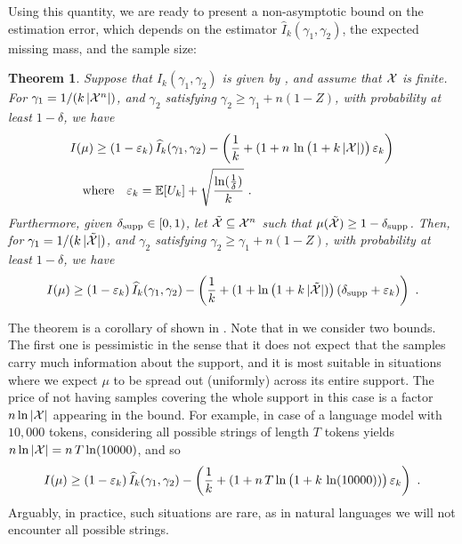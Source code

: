 \documentclass[a4paper]{article}
\theoremstyle{plain}
\newtheorem{theorem}{Theorem}[section]
\theoremstyle{definition}
\theoremstyle{plain}
\begin{document}
Using this quantity, we are ready to present a non-asymptotic bound on the estimation error, which depends on the estimator $\widehat I_k(\gamma_1, \gamma_2)$, the expected missing mass, and the sample size:%
\begin{theorem}
\label{thm:emp-wav-MI1}
Suppose that $\widehat I_k(\gamma_1, \gamma_2)$ is given by , and assume that ${\mathcal{X}}$ is finite.
%
For $\gamma_1 = 1/(k \, |{\mathcal{X}}^n|)$, and $\gamma_2$ satisfying $\gamma_2 \geq \gamma_1 + n (1-Z)$,
with probability at least $1-\delta$, we have
  \begin{align*}
    &I(\mu)
    \geq
    (1 - \varepsilon_k) \, \widehat I_k(\gamma_1, \gamma_2)
    -
    \left( 
    \frac{1}{k}
    +
    (1+
    n \, \ln \big( 1 + k \, |{\mathcal{X}}|) \big) \, \varepsilon_k
     \right)\\
    &\quad\text{where} \quad \varepsilon_k = \mathbb{E}[U_k] + \sqrt{\frac{\ln(\frac{1}{\delta})}{k}}~.
  \end{align*}
  Furthermore, given $\delta_{\mathrm{supp}} \in [0, 1)$, let $\tilde {{\mathcal{X}}} \subseteq {\mathcal{X}}^n$ such that $\mu(\tilde {{\mathcal{X}}}) \geq 1 - \delta_{\mathrm{supp}}$.
  Then, for $\gamma_1 = 1/(k \, |\tilde {{\mathcal{X}}}|)$, and $\gamma_2$ satisfying $\gamma_2 \geq \gamma_1 + n (1-Z)$,
with probability at least $1-\delta$, we have
  \begin{align*}
    I(\mu)
    \geq
    (1 - \varepsilon_k) \, \widehat I_k(\gamma_1, \gamma_2)
    -
    \left( 
    \frac{1}{k}
    +
    (1+ \ln \big( 1 + k \, |\tilde{{\mathcal{X}}}|) \big) \left(  \delta_{\mathrm{supp}} + \varepsilon_k  \right)
     \right)~.
  \end{align*}
\end{theorem}
%
%
The theorem is a corollary of  shown in .
%
%
Note that in  we consider two bounds. The first one is pessimistic in the sense that it does not expect that the samples carry much information about the support, and it is most suitable in situations where we expect $\mu$ to be spread out (uniformly) across its entire support.
The price of not having samples covering the whole support in this case is a factor $n \ln |{\mathcal{X}}|$ appearing in the bound.
For example, in case of a language model with $10,000$ tokens, considering all possible strings of length $T$ tokens yields $n \ln |{\mathcal{X}}| = n \, T \ln(10000)$, and so
%
\begin{align*}
  I(\mu)
    \geq
    (1 - \varepsilon_k) \, \widehat I_k(\gamma_1, \gamma_2)
    -
    \left( 
    \frac{1}{k}
    +
    (1+
    n \, T \ln \big( 1 + k \, \ln(10000)) \big) \, \varepsilon_k
     \right)~.
\end{align*}
%
%
%
Arguably, in practice, such situations are rare, as in natural languages we will not encounter all possible strings.
\end{document}
